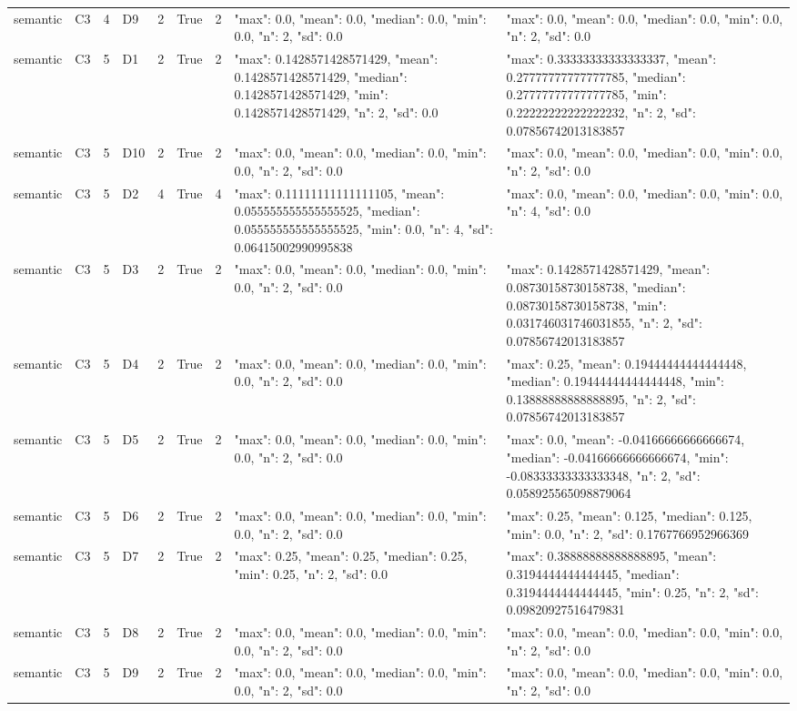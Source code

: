 \begin{tabular}{lllllllll}
semantic & C3 & 4 & D9 & 2 & True & 2 & {"max": 0.0, "mean": 0.0, "median": 0.0, "min": 0.0, "n": 2, "sd": 0.0} & {"max": 0.0, "mean": 0.0, "median": 0.0, "min": 0.0, "n": 2, "sd": 0.0} \\
semantic & C3 & 5 & D1 & 2 & True & 2 & {"max": 0.1428571428571429, "mean": 0.1428571428571429, "median": 0.1428571428571429, "min": 0.1428571428571429, "n": 2, "sd": 0.0} & {"max": 0.33333333333333337, "mean": 0.27777777777777785, "median": 0.27777777777777785, "min": 0.22222222222222232, "n": 2, "sd": 0.07856742013183857} \\
semantic & C3 & 5 & D10 & 2 & True & 2 & {"max": 0.0, "mean": 0.0, "median": 0.0, "min": 0.0, "n": 2, "sd": 0.0} & {"max": 0.0, "mean": 0.0, "median": 0.0, "min": 0.0, "n": 2, "sd": 0.0} \\
semantic & C3 & 5 & D2 & 4 & True & 4 & {"max": 0.11111111111111105, "mean": 0.055555555555555525, "median": 0.055555555555555525, "min": 0.0, "n": 4, "sd": 0.06415002990995838} & {"max": 0.0, "mean": 0.0, "median": 0.0, "min": 0.0, "n": 4, "sd": 0.0} \\
semantic & C3 & 5 & D3 & 2 & True & 2 & {"max": 0.0, "mean": 0.0, "median": 0.0, "min": 0.0, "n": 2, "sd": 0.0} & {"max": 0.1428571428571429, "mean": 0.08730158730158738, "median": 0.08730158730158738, "min": 0.031746031746031855, "n": 2, "sd": 0.07856742013183857} \\
semantic & C3 & 5 & D4 & 2 & True & 2 & {"max": 0.0, "mean": 0.0, "median": 0.0, "min": 0.0, "n": 2, "sd": 0.0} & {"max": 0.25, "mean": 0.19444444444444448, "median": 0.19444444444444448, "min": 0.13888888888888895, "n": 2, "sd": 0.07856742013183857} \\
semantic & C3 & 5 & D5 & 2 & True & 2 & {"max": 0.0, "mean": 0.0, "median": 0.0, "min": 0.0, "n": 2, "sd": 0.0} & {"max": 0.0, "mean": -0.04166666666666674, "median": -0.04166666666666674, "min": -0.08333333333333348, "n": 2, "sd": 0.058925565098879064} \\
semantic & C3 & 5 & D6 & 2 & True & 2 & {"max": 0.0, "mean": 0.0, "median": 0.0, "min": 0.0, "n": 2, "sd": 0.0} & {"max": 0.25, "mean": 0.125, "median": 0.125, "min": 0.0, "n": 2, "sd": 0.1767766952966369} \\
semantic & C3 & 5 & D7 & 2 & True & 2 & {"max": 0.25, "mean": 0.25, "median": 0.25, "min": 0.25, "n": 2, "sd": 0.0} & {"max": 0.38888888888888895, "mean": 0.3194444444444445, "median": 0.3194444444444445, "min": 0.25, "n": 2, "sd": 0.09820927516479831} \\
semantic & C3 & 5 & D8 & 2 & True & 2 & {"max": 0.0, "mean": 0.0, "median": 0.0, "min": 0.0, "n": 2, "sd": 0.0} & {"max": 0.0, "mean": 0.0, "median": 0.0, "min": 0.0, "n": 2, "sd": 0.0} \\
semantic & C3 & 5 & D9 & 2 & True & 2 & {"max": 0.0, "mean": 0.0, "median": 0.0, "min": 0.0, "n": 2, "sd": 0.0} & {"max": 0.0, "mean": 0.0, "median": 0.0, "min": 0.0, "n": 2, "sd": 0.0} \\
\end{tabular}